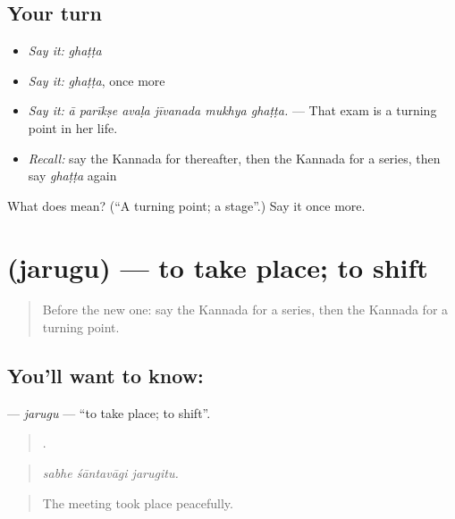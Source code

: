 \subsection*{Your turn}
\begin{itemize}
\raggedright
  \item \emph{Say it:} \emph{ghaṭṭa}
  \item \emph{Say it:} \emph{ghaṭṭa}, once more
  \item \emph{Say it:} \emph{ā parīkṣe avaḷa jīvanada mukhya ghaṭṭa.} — That exam is a turning point in her life.
  \item \emph{Recall:} say the Kannada for thereafter, then the Kannada for a series, then say \emph{ghaṭṭa} again
\end{itemize}

\begin{tcolorbox}[breakable,colback=teal!4,colframe=teal!35!black,title={Before you move on}]
What does  mean? (\textquotedblleft{}A turning point; a stage\textquotedblright{}.) Say it once more.
\end{tcolorbox}
\section[\texorpdfstring{\kn{ಜರುಗು} (jarugu)}{ಜರುಗು (jarugu)}]{ (jarugu) — to take place; to shift}

\label{lesson:KA-C368-jarugu}



\begin{quote}
Before the new one: say the Kannada for a series, then the Kannada for a turning point.
\end{quote}

\subsection*{You'll want to know: }
\textbf{} — \emph{jarugu} — \textquotedblleft{}to take place; to shift\textquotedblright{}.

\begin{quote}
  .
\end{quote}

\begin{quote}
\emph{sabhe śāntavāgi jarugitu.}
\end{quote}

\begin{quote}
The meeting took place peacefully.
\end{quote}

